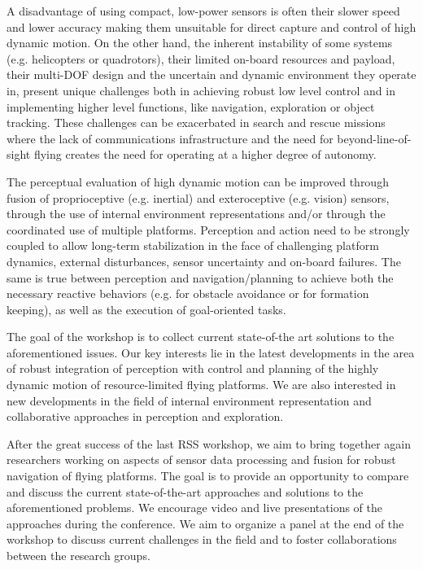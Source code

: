 \begin{spacing}{1.0}
{A disadvantage of using compact, low-power sensors is often their slower speed and lower accuracy making them unsuitable for direct capture and control of high dynamic motion. On the other hand, the inherent instability of some systems (e.g. helicopters or quadrotors), their limited on-board resources and payload, their multi-DOF design and the uncertain and dynamic environment they operate in, present unique challenges both in achieving robust low level control and in implementing higher level functions, like navigation, exploration or object tracking. These challenges can be exacerbated in search and rescue missions where the lack of communications infrastructure and the need for beyond-line-of-sight flying creates the need for operating at a higher degree of autonomy.

The perceptual evaluation of high dynamic motion can be improved through fusion of proprioceptive (e.g. inertial) and exteroceptive (e.g. vision) sensors, through the use of internal environment representations and/or through the coordinated use of multiple platforms. Perception and action need to be strongly coupled to allow long-term stabilization in the face of challenging platform dynamics, external disturbances, sensor uncertainty and on-board failures. The same is true between perception and navigation/planning to achieve both the necessary reactive behaviors (e.g. for obstacle avoidance or for formation keeping), as well as the execution of goal-oriented tasks.

The goal of the workshop is to collect current state-of-the art solutions to the aforementioned issues. Our key interests lie in the latest developments in the area of robust integration of perception with control and planning of the highly dynamic motion of resource-limited flying platforms. We are also interested in new developments in the field of internal environment representation and collaborative approaches in perception and exploration.

After the great success of the last RSS workshop, we aim to bring together again researchers working on aspects of sensor data processing and fusion for robust navigation of flying platforms. The goal is to provide an opportunity to compare and discuss the current state-of-the-art approaches and solutions to the aforementioned problems. We encourage video and live presentations of the approaches during the conference. We aim to organize a panel at the end of the workshop to discuss current challenges in the field and to foster collaborations between the research groups.
}


\end{spacing}
